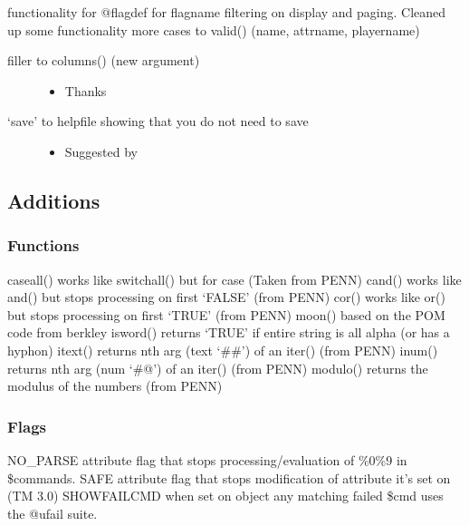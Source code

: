 \documentclass[letterpaper,10pt,english]{sphinxmanual}
\begin{document}
\sphinxAtStartPar
functionality for @flagdef for flagname filtering on display and paging.  Cleaned up some functionality more cases to valid() (name, attrname, playername)
\begin{description}
\item[{filler to columns() (new argument)}] \leavevmode\begin{itemize}
\item {} 
\sphinxAtStartPar
Thanks 

\end{itemize}

\item[{‘save’ to helpfile showing that you do not need to save}] \leavevmode\begin{itemize}
\item {} 
\sphinxAtStartPar
Suggested by 

\end{itemize}

\end{description}


\subsection{Additions}
\label{\detokenize{changelog:id53}}

\subsubsection{Functions}
\label{\detokenize{changelog:id54}}
\sphinxAtStartPar
caseall() \sphinxhyphen{} works like switchall() but for case (Taken from PENN)
cand() \sphinxhyphen{} works like and() but stops processing on first ‘FALSE’ (from PENN)
cor() \sphinxhyphen{} works like or() but stops processing on first ‘TRUE’ (from PENN)
moon() \sphinxhyphen{} based on the POM code from berkley
isword() \sphinxhyphen{} returns ‘TRUE’ if entire string is all alpha (or has a hyphon)
itext() \sphinxhyphen{} returns nth arg (text ‘\#\#’) of an iter() (from PENN)
inum() \sphinxhyphen{} returns nth arg (num ‘\#@’) of an iter() (from PENN)
modulo() \sphinxhyphen{} returns the modulus of the numbers (from PENN)


\subsubsection{Flags}
\label{\detokenize{changelog:id55}}
\sphinxAtStartPar
NO\_PARSE \sphinxhyphen{} attribute flag that stops processing/evaluation of \%0\sphinxhyphen{}\%9 in \$commands.
SAFE \sphinxhyphen{} attribute flag that stops modification of attribute it’s set on (TM 3.0)
SHOWFAILCMD \sphinxhyphen{} when set on object any matching failed \$cmd uses the @ufail suite.
\end{document}
